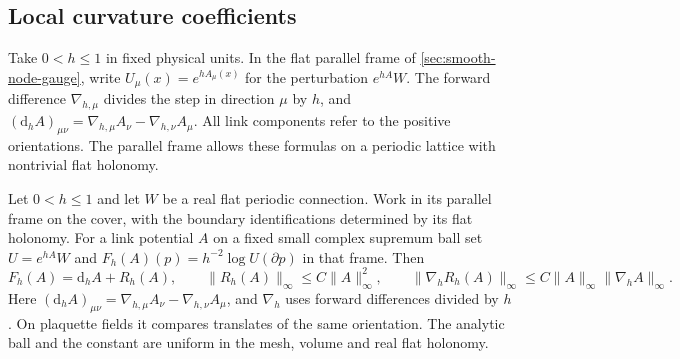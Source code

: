 \documentclass[11pt,letterpaper,reqno]{amsart}
\makeatletter
\numberwithin{equation}{section}
\theoremstyle{definition}
\newcommand{\ms@minorstart}{%
  \pushQED{\qed}\renewcommand{\qedsymbol}{$\blacksquare$}}
\newenvironment{lemma}[1][]{\ms@minorstart\ms@lemma[#1]}
  {\popQED\endms@lemma}
\theoremstyle{remark}
\makeatother
\begin{document}
\subsection{Local curvature coefficients}

Take \(0<h\leq1\) in fixed physical units. In the flat parallel
frame of \cref{sec:smooth-node-gauge}, write
\(U_\mu(x)=e^{hA_\mu(x)}\) for the perturbation \(e^{hA}W\).
The forward difference \(\nabla_{h,\mu}\) divides the step in
direction \(\mu\) by \(h\), and
\((\mathrm d_h A)_{\mu\nu}=\nabla_{h,\mu}A_\nu-\nabla_{h,\nu}A_\mu\).
All link components refer to the positive orientations. The
parallel frame allows these formulas on a periodic lattice with
nontrivial flat holonomy.

\begin{lemma}[Curvature expansion]\label{lem:wilson-curvature-expansion}
Let \(0<h\le1\) and let \(W\) be a real flat periodic connection.
Work in its parallel frame on the cover, with the boundary
identifications determined by its flat holonomy. For a link
potential \(A\) on a fixed small complex supremum ball set
\(U=e^{hA}W\) and \(F_h(A)(p)=h^{-2}\log U(\partial p)\) in
that frame. Then
\begin{equation}\label{eq:wilson-curvature-expansion}
 F_h(A)=\mathrm d_h A+R_h(A),\qquad
 \|R_h(A)\|_\infty\le C\|A\|_\infty^2,\qquad
 \|\nabla_hR_h(A)\|_\infty
            \le C\|A\|_\infty\|\nabla_h A\|_\infty .
\end{equation}
Here \((\mathrm d_hA)_{\mu\nu}=\nabla_{h,\mu}A_\nu-
\nabla_{h,\nu}A_\mu\), and \(\nabla_h\) uses forward
differences divided by \(h\). On plaquette fields it compares
translates of the same orientation. The analytic ball and the
constant are uniform in the mesh, volume and real flat holonomy.
\end{lemma}
\end{document}
